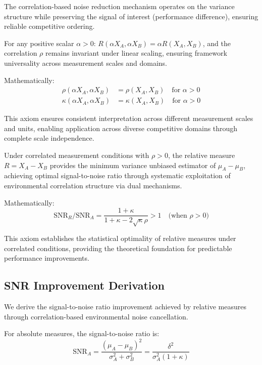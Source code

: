 The correlation-based noise reduction mechanism operates on the variance structure while preserving the signal of interest (performance difference), ensuring reliable competitive ordering.

\begin{axiom}
For any positive scalar $\alpha > 0$: $R(\alpha X_A, \alpha X_B) = \alpha R(X_A, X_B)$, and the correlation $\rho$ remains invariant under linear scaling, ensuring framework universality across measurement scales and domains.

Mathematically:
\begin{align}
\rho(\alpha X_A, \alpha X_B) &= \rho(X_A, X_B) \quad \text{for } \alpha > 0 \\
\kappa(\alpha X_A, \alpha X_B) &= \kappa(X_A, X_B) \quad \text{for } \alpha > 0
\end{align}
\end{axiom}

This axiom ensures consistent interpretation across different measurement scales and units, enabling application across diverse competitive domains through complete scale independence.

\begin{axiom}
Under correlated measurement conditions with $\rho > 0$, the relative measure $R = X_A - X_B$ provides the minimum variance unbiased estimator of $\mu_A - \mu_B$, achieving optimal signal-to-noise ratio through systematic exploitation of environmental correlation structure via dual mechanisms.

Mathematically:
$$\text{SNR}_R/\text{SNR}_A = \frac{1 + \kappa}{1 + \kappa - 2\sqrt{\kappa}\rho} > 1 \quad \text{(when } \rho > 0\text{)}$$
\end{axiom}

This axiom establishes the statistical optimality of relative measures under correlated conditions, providing the theoretical foundation for predictable performance improvements.

\subsection{SNR Improvement Derivation}

We derive the signal-to-noise ratio improvement achieved by relative measures through correlation-based environmental noise cancellation.

For absolute measures, the signal-to-noise ratio is:
\begin{equation}
\text{SNR}_A = \frac{(\mu_A - \mu_B)^2}{\sigma_A^2 + \sigma_B^2} = \frac{\delta^2}{\sigma_A^2(1 + \kappa)} \label{eq:absolute_snr}
\end{equation}

